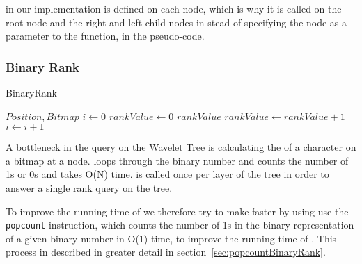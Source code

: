  in our implementation is defined on each node, which is why it is called on the root node and the right and left child nodes in stead of specifying the node as a parameter to the  function, in the pseudo-code.

\subsubsection{Binary Rank} 
\label{sec:TheoryBinaryRank}
\begin{algorithm}
\caption{BinaryRank}
\label{alg:binaryrank}
\begin{algorithmic}
 {$Position, Bitmap$}
\State $i \gets 0$
\State $rankValue \gets 0$
\State \Return $rankValue$
\EndIf
{}
\State $rankValue \gets rankValue + 1$
\EndIf
\State $i \gets i + 1$
\EndFor
\EndFunction
\end{algorithmic}
\end{algorithm}
A bottleneck in the  query on the Wavelet Tree is calculating the  of a character on a bitmap at a node.
 loops through the binary number and counts the number of 1s or 0s and takes O(N) time.  is called once per layer of the tree in order to answer a single rank query on the tree. 

To improve the running time of  we therefore try to make  faster by using use the \texttt{popcount} instruction, which counts the number of 1s in the binary representation of a given binary number in O(1) time, to improve the running time of . 
This process in described in greater detail in section~\ref{sec:popcountBinaryRank}.

